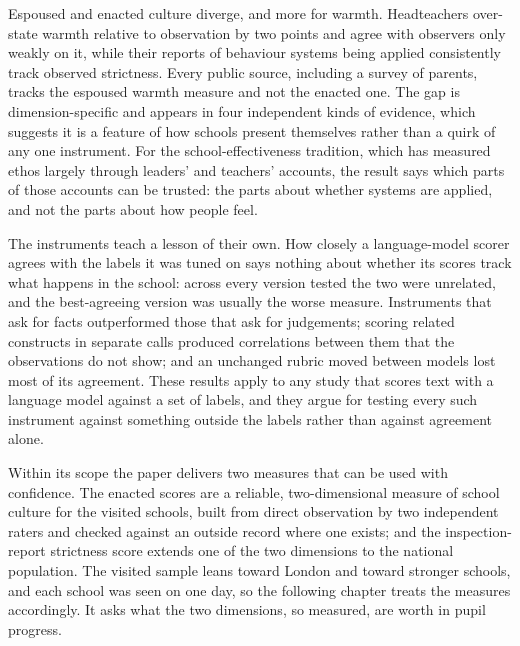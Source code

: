 Espoused and enacted culture diverge, and more for warmth. Headteachers
over-state warmth relative to observation by two points and agree with
observers only weakly on it, while their reports of behaviour systems being
applied consistently track observed strictness. Every public source, including
a survey of parents, tracks the espoused warmth measure and not the enacted
one. The gap is dimension-specific and appears in four independent kinds of
evidence, which suggests it is a feature of how schools present themselves
rather than a quirk of any one instrument. For the school-effectiveness
tradition, which has measured ethos largely through leaders' and teachers'
accounts, the result says which parts of those accounts can be trusted: the
parts about whether systems are applied, and not the parts about how people
feel.

The instruments teach a lesson of their own. How closely a language-model
scorer agrees with the labels it was tuned on says nothing about whether its
scores track what happens in the school: across every version tested the two
were unrelated, and the best-agreeing version was usually the worse measure.
Instruments that ask for facts outperformed those that ask for judgements;
scoring related constructs in separate calls produced correlations between
them that the observations do not show; and an unchanged rubric moved between
models lost most of its agreement. These results apply to any study that
scores text with a language model against a set of labels, and they argue for
testing every such instrument against something outside the labels rather
than against agreement alone.

Within its scope the paper delivers two measures that can be used with
confidence. The enacted scores are a reliable, two-dimensional measure of
school culture for the visited schools, built from direct observation by two
independent raters and checked against an outside record where one exists;
and the inspection-report strictness score extends one of the two dimensions
to the national population. The visited sample leans toward London and toward
stronger schools, and each school was seen on one day, so the following
chapter treats the measures accordingly. It asks what the two dimensions, so
measured, are worth in pupil progress.
